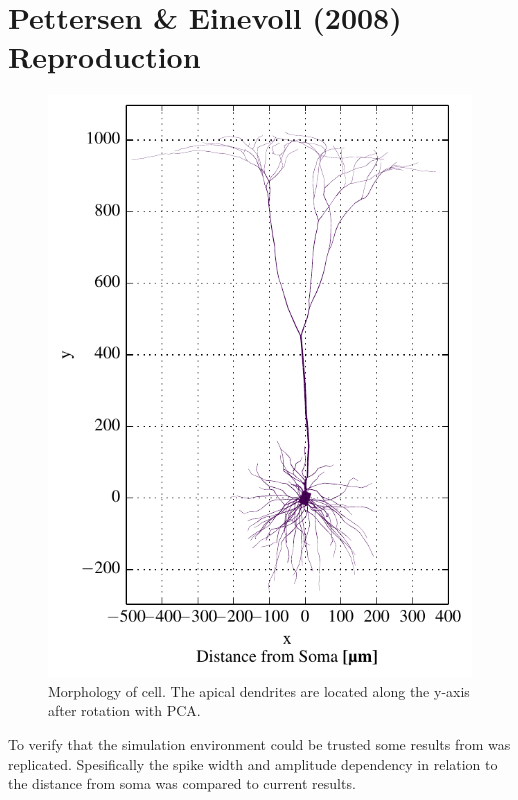 \documentclass[altfont, fleqn]{uiophd}
\begin{document}
\section{Pettersen \& Einevoll (2008) Reproduction}
\begin{figure}
    \vspace{-20pt}
    \begin{center}
        \includegraphics[width=\linewidth]{images/4_1/morph_xy_up.pdf}
        \vspace{-20pt}
        \caption{%
            Morphology of \textcite{mainen_influence_1996} cell. 
            The apical dendrites are located along the y-axis after rotation
            with PCA.}
        \label{fig:4_1_morph}
        \vspace{-10pt}
    \end{center}
\end{figure}
%
To verify that the simulation environment could be trusted 
some results from 
\textcite{pettersen_amplitude_2008} was replicated.
Spesifically the spike width and amplitude dependency in relation to 
the distance from soma was compared to current results. 
\end{document}
